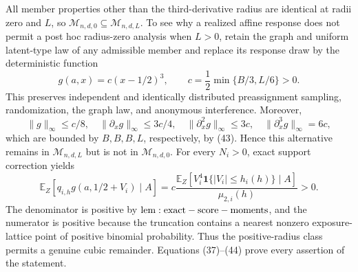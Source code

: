 All member properties other than the third-derivative radius are identical at radii zero and \(L\), so \(\mathcal M_{n,d,0}\subseteq\mathcal M_{n,d,L}\).  To see why a realized affine response does not permit a post hoc radius-zero analysis when \(L>0\), retain the graph and uniform latent-type law of any admissible member and replace its response draw by the deterministic function
\[
 g(a,x)=c(x-1/2)^3,
 \qquad c=\frac12\min\{B/3,L/6\}>0.
\tag{43}
\]
This preserves independent and identically distributed preassignment sampling, randomization, the graph law, and anonymous interference.  Moreover,
\[
 \|g\|_\infty\le c/8,\quad
 \|\partial_xg\|_\infty\le3c/4,\quad
 \|\partial_x^2g\|_\infty\le3c,\quad
 \|\partial_x^3g\|_\infty=6c,
\]
which are bounded by \(B,B,B,L\), respectively, by (43).  Hence this alternative remains in \(\mathcal M_{n,d,L}\) but is not in \(\mathcal M_{n,d,0}\).  For every \(N_i>0\), exact support correction yields
\[
 \mathbb E_Z[q_{i,h}g(a,1/2+V_i)\mid A]
 =c\frac{\mathbb E_Z[V_i^4\mathbf1\{|V_i|\le h_i(h)\}\mid A]}
          {\mu_{2,i}(h)}>0.
\tag{44}
\]
The denominator is positive by \({\rm lem:exact-score-moments}\), and the numerator is positive because the truncation contains a nearest nonzero exposure-lattice point of positive binomial probability.  Thus the positive-radius class permits a genuine cubic remainder.  Equations (37)--(44) prove every assertion of the statement.